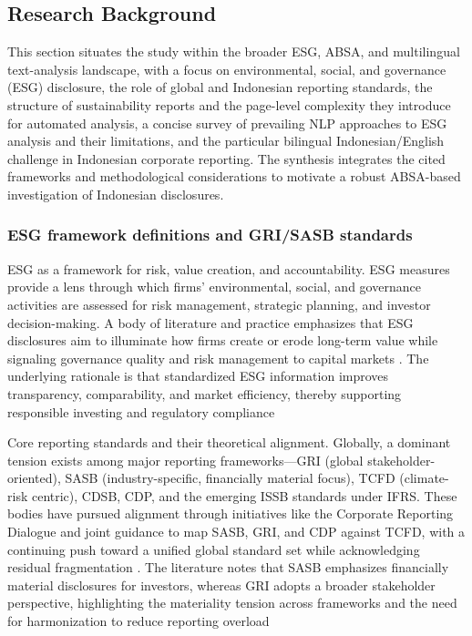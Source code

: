 \subsection{Research Background}

This section situates the study within the broader ESG, ABSA, and multilingual text-analysis landscape, with a focus on environmental, social, and governance (ESG) disclosure, the role of global and Indonesian reporting standards, the structure of sustainability reports and the page-level complexity they introduce for automated analysis, a concise survey of prevailing NLP approaches to ESG analysis and their limitations, and the particular bilingual Indonesian/English challenge in Indonesian corporate reporting. The synthesis integrates the cited frameworks and methodological considerations to motivate a robust ABSA-based investigation of Indonesian disclosures.

\subsubsection{ESG framework definitions and GRI/SASB standards}
ESG as a framework for risk, value creation, and accountability. ESG measures provide a lens through which firms’ environmental, social, and governance activities are assessed for risk management, strategic planning, and investor decision-making. A body of literature and practice emphasizes that ESG disclosures aim to illuminate how firms create or erode long-term value while signaling governance quality and risk management to capital markets \cite{10.1177/1086026620945342,10.1111/jacf.12411,10.1016/j.cpa.2021.102309}. The underlying rationale is that standardized ESG information improves transparency, comparability, and market efficiency, thereby supporting responsible investing and regulatory compliance \cite{10.1177/1086026620945342,10.20900/jsr20210006,10.20944/preprints202407.2036.v1}

Core reporting standards and their theoretical alignment. Globally, a dominant tension exists among major reporting frameworks—GRI (global stakeholder-oriented), SASB (industry-specific, financially material focus), TCFD (climate-risk centric), CDSB, CDP, and the emerging ISSB standards under IFRS. These bodies have pursued alignment through initiatives like the Corporate Reporting Dialogue and joint guidance to map SASB, GRI, and CDP against TCFD, with a continuing push toward a unified global standard set while acknowledging residual fragmentation \cite{10.1108/medar-11-2020-1097,10.20900/jsr20210006,10.1108/aaaj-06-2021-5330,10.1108/aaaj-02-2020-4445,10.1016/j.cpa.2021.102309,10.1111/1911-3838.12232}. The literature notes that SASB emphasizes financially material disclosures for investors, whereas GRI adopts a broader stakeholder perspective, highlighting the materiality tension across frameworks and the need for harmonization to reduce reporting overload \cite{10.20900/jsr20210006,10.1016/j.cpa.2021.102309}

